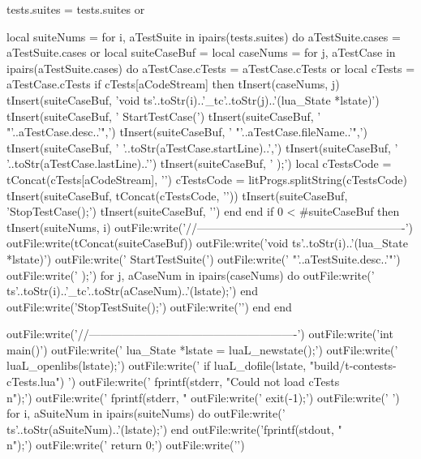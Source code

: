   tests.suites = tests.suites or { }

  local suiteNums = { }
  for i, aTestSuite in ipairs(tests.suites) do
    aTestSuite.cases = aTestSuite.cases or { }
    local suiteCaseBuf = { }
    local caseNums     = { }
    for j, aTestCase in ipairs(aTestSuite.cases) do
      aTestCase.cTests = aTestCase.cTests or { }
      local cTests     = aTestCase.cTests
      if cTests[aCodeStream] then
        tInsert(caseNums, j)
        tInsert(suiteCaseBuf, 'void ts'..toStr(i)..'_tc'..toStr(j)..'(lua_State *lstate){\n\n')
        tInsert(suiteCaseBuf, '  StartTestCase(\n')
        tInsert(suiteCaseBuf, '    "'..aTestCase.desc..'",\n')
        tInsert(suiteCaseBuf, '    "'..aTestCase.fileName..'",\n')
        tInsert(suiteCaseBuf, '    '..toStr(aTestCase.startLine)..',\n')
        tInsert(suiteCaseBuf, '    '..toStr(aTestCase.lastLine)..'\n')
        tInsert(suiteCaseBuf, '  );\n\n  ')
        local cTestsCode = tConcat(cTests[aCodeStream], '\n')
        cTestsCode       = litProgs.splitString(cTestsCode)
        tInsert(suiteCaseBuf, tConcat(cTestsCode, '\n  '))
        tInsert(suiteCaseBuf, '\n\n  StopTestCase();\n\n')
        tInsert(suiteCaseBuf, '}\n\n')
      end
    end
    if 0 < #suiteCaseBuf then
      tInsert(suiteNums, i)
      outFile:write('//-------------------------------------------------------\n')
      outFile:write(tConcat(suiteCaseBuf))
      outFile:write('void ts'..toStr(i)..'(lua_State *lstate){\n\n')
      outFile:write('  StartTestSuite(\n')
      outFile:write('    "'..aTestSuite.desc..'"\n')
      outFile:write('  );\n\n')
      for j, aCaseNum in ipairs(caseNums) do
        outFile:write('  ts'..toStr(i)..'_tc'..toStr(aCaseNum)..'(lstate);\n')
      end
      outFile:write('\n  StopTestSuite();\n\n')
      outFile:write('}\n\n')
    end
  end

  outFile:write('//-------------------------------------------------------\n')
  outFile:write('int main(){\n\n')
  outFile:write('  lua_State *lstate = luaL_newstate();\n')
  outFile:write('  luaL_openlibs(lstate);\n')
  outFile:write('  if luaL_dofile(lstate, "build/t-contests-cTests.lua") {\n')
  outFile:write('    fprintf(stderr, "Could not load cTests\\n");\n')
  outFile:write('    fprintf(stderr, "%
  outFile:write('    exit(-1);\n')
  outFile:write('  }\n\n')
  for i, aSuiteNum in ipairs(suiteNums) do
    outFile:write('  ts'..toStr(aSuiteNum)..'(lstate);\n')
  end
  outFile:write('\n  fprintf(stdout, "\\n");\n\n')
  outFile:write('  return 0;\n')
  outFile:write('}\n')

